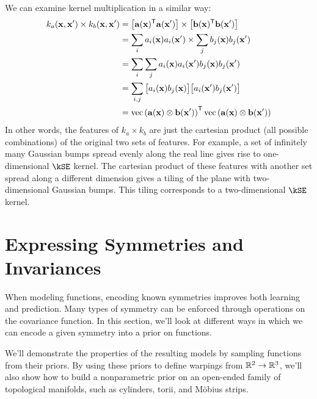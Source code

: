 We can examine kernel multiplication in a similar way:
%
\begin{align}
k_a({\bf{x}}, {\bf{x}}') \times k_b({\bf{x}}, {\bf{x}}')
& = \left[ {\bf{a}}({\bf{x}})^{\mathsf{T}} {\bf{a}}({\bf{x}}') \right] \times \left[ {\bf{b}}({\bf{x}})^{\mathsf{T}} {\bf{b}}({\bf{x}}') \right] \\
& = \sum_i a_i({\bf{x}}) a_i({\bf{x}}') \times \sum_j b_j({\bf{x}}) b_j({\bf{x}}') \\
& = \sum_i \sum_j a_i({\bf{x}}) a_i({\bf{x}}') b_j({\bf{x}}) b_j({\bf{x}}') \\
& = \sum_{i,j} \big[ a_i({\bf{x}}) b_j({\bf{x}}) \big] \big[ a_i({\bf{x}}') b_j({\bf{x}}') \big] \\
& = \operatorname{vec} \left( { {\bf{a}}({\bf{x}}) \otimes {\bf{b}}({\bf{x}}') } \right) ^{\mathsf{T}} \operatorname{vec} \left( { {\bf{a}}({\bf{x}}) \otimes {\bf{b}}({\bf{x}}')} \right) 
\end{align}
%
In other words, the features of $k_a \times k_b$ are just the cartesian product (all possible combinations) of the original two sets of features.
For example, a set of infinitely many Gaussian bumps spread evenly along the real line gives rise to one-dimensional $\kSE$ kernel.
The cartesian product of these features with another set spread along a different dimension gives a tiling of the plane with two-dimensional Gaussian bumps.
This tiling corresponds to a two-dimensional $\kSE$ kernel.






\section{Expressing Symmetries and Invariances}

When modeling functions, encoding known symmetries improves both learning and prediction. 
Many types of symmetry can be enforced through operations on the covariance function.
In this section, we'll look at different ways in which we can encode a given symmetry into a prior on functions.

We'll demonstrate the properties of the resulting models by sampling functions from their priors.
By using these priors to define warpings from $\mathbb{R}^2 \to \mathbb{R}^3$, we'll also show how to build a nonparametric prior on an open-ended family of topological manifolds, such as cylinders, torii, and M\"{o}bius strips.

